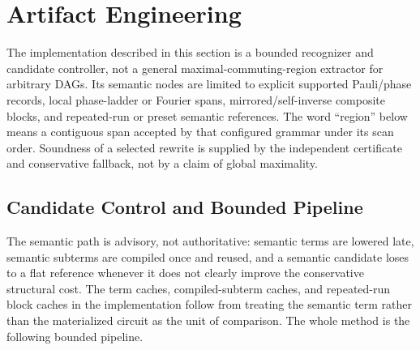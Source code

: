 \section{Artifact Engineering}
\label{supp:artifact}
The implementation described in this section is a bounded recognizer and
candidate controller, not a general maximal-commuting-region extractor for
arbitrary DAGs.  Its semantic nodes are limited to explicit supported
Pauli/phase records, local phase-ladder or Fourier spans,
mirrored/self-inverse composite blocks, and repeated-run or preset semantic
references.  The word ``region'' below means a contiguous span accepted by
that configured grammar under its scan order.  Soundness of a selected
rewrite is supplied by the independent certificate and conservative
fallback, not by a claim of global maximality.

\subsection{Candidate Control and Bounded Pipeline}

The semantic path is advisory, not authoritative: semantic terms are
lowered late, semantic subterms are compiled once and reused, and a
semantic candidate loses to a flat reference whenever it does not
clearly improve the conservative structural cost.  The term caches,
compiled-subterm caches, and repeated-run block caches in the
implementation follow from treating the semantic term rather than the
materialized circuit as the unit of comparison.  The whole method is the
following bounded pipeline.

